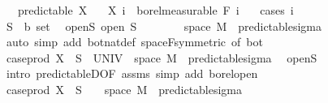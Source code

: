 \begin{isabellebody}
\ \ \ {\isachardoublequoteopen}predictable\ X{\isachardoublequoteclose}\isanewline
\ \ \ {\isachardoublequoteopen}X\ i\ {\isasymin}\ borel{\isacharunderscore}{\kern0pt}measurable\ {\isacharparenleft}{\kern0pt}F\ {\isacharparenleft}{\kern0pt}i\ {\isacharminus}{\kern0pt}\ {}{\isacharparenright}{\kern0pt}{\isacharparenright}{\kern0pt}{\isachardoublequoteclose}\isanewline
%
\isadelimproof
%
\endisadelimproof
%
\isatagproof
{}\isamarkupfalse%
\ {\isacharparenleft}{\kern0pt}cases\ i{\isacharparenright}{\kern0pt}\isanewline
\ \ \isamarkupfalse%
\ {}\isanewline
\ \ \isacommand{{\isacharbraceleft}{\kern0pt}}\isamarkupfalse%
\isanewline
\ \ \ \ \isamarkupfalse%
\ S\ {\isacharcolon}{\kern0pt}{\isacharcolon}{\kern0pt}\ {\isachardoublequoteopen}{\isacharprime}{\kern0pt}b\ set{\isachardoublequoteclose}\ \isamarkupfalse%
\ open{\isacharunderscore}{\kern0pt}S{\isacharcolon}{\kern0pt}\ {\isachardoublequoteopen}open\ S{\isachardoublequoteclose}\isanewline
\ \ \ \ \isamarkupfalse%
\ {\isachardoublequoteopen}{\isacharbraceleft}{\kern0pt}{}{\isacharbraceright}{\kern0pt}\ {\isasymtimes}\ space\ M\ {\isasymin}\ predictable{\isacharunderscore}{\kern0pt}sigma{\isachardoublequoteclose}\ \isamarkupfalse%
\ {\isacharparenleft}{\kern0pt}auto\ simp\ add{\isacharcolon}{\kern0pt}\ bot{\isacharunderscore}{\kern0pt}nat{\isacharunderscore}{\kern0pt}def\ space{\isacharunderscore}{\kern0pt}F{\isacharbrackleft}{\kern0pt}symmetric{\isacharcomma}{\kern0pt}\ of\ bot{\isacharbrackright}{\kern0pt}{\isacharparenright}{\kern0pt}\isanewline
\ \ \ \ \isamarkupfalse%
\ \isamarkupfalse%
\ {\isachardoublequoteopen}case{\isacharunderscore}{\kern0pt}prod\ X\ {\isacharminus}{\kern0pt}{\isacharbackquote}{\kern0pt}\ S\ {\isasyminter}\ {\isacharparenleft}{\kern0pt}UNIV\ {\isasymtimes}\ space\ M{\isacharparenright}{\kern0pt}\ {\isasymin}\ predictable{\isacharunderscore}{\kern0pt}sigma{\isachardoublequoteclose}\ \isamarkupfalse%
\ open{\isacharunderscore}{\kern0pt}S\ \isamarkupfalse%
\ {\isacharparenleft}{\kern0pt}intro\ predictableD{\isacharbrackleft}{\kern0pt}OF\ assms{\isacharbrackright}{\kern0pt}{\isacharcomma}{\kern0pt}\ simp\ add{\isacharcolon}{\kern0pt}\ borel{\isacharunderscore}{\kern0pt}open{\isacharparenright}{\kern0pt}\ \ \isanewline
\ \ \ \ \isamarkupfalse%
\ \isamarkupfalse%
\ {\isachardoublequoteopen}case{\isacharunderscore}{\kern0pt}prod\ X\ {\isacharminus}{\kern0pt}{\isacharbackquote}{\kern0pt}\ S\ {\isasyminter}\ {\isacharparenleft}{\kern0pt}{\isacharbraceleft}{\kern0pt}{}{\isacharbraceright}{\kern0pt}\ {\isasymtimes}\ space\ M{\isacharparenright}{\kern0pt}\ {\isasymin}\ predictable{\isacharunderscore}{\kern0pt}sigma{\isachardoublequoteclose}\ \isamarkupfalse%

\end{isabellebody}
